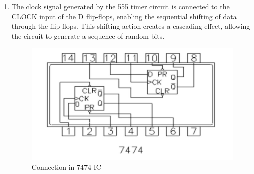\documentclass[journal,12pt,twocolumn]{IEEEtran}
\begin{document}
\begin{enumerate}
	\item The clock signal generated by the 555 timer circuit is connected to the CLOCK input of the D flip-flops, enabling the sequential shifting of data through the flip-flops. This shifting action creates a cascading effect, allowing the circuit to generate a sequence of random bits.
	\begin{figure}[h]
		\includegraphics[width=\linewidth]{images/fig03.jpg}
		\caption{Connection in 7474 IC}
		\label{7474_IC}
	\end{figure}


\end{enumerate}
\end{document}
